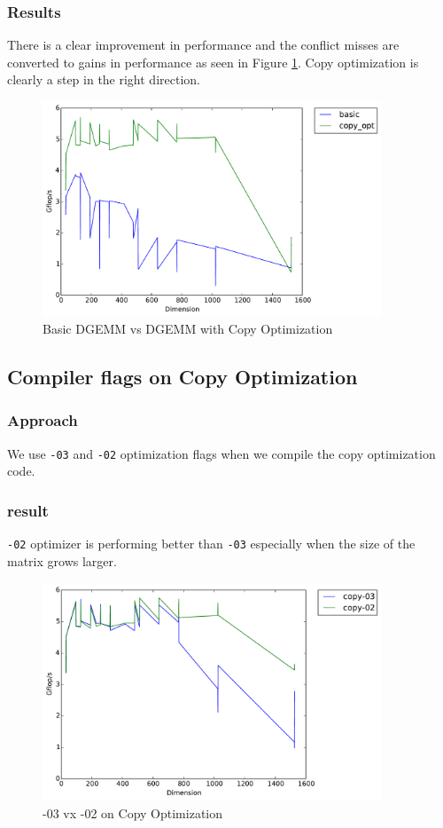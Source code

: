 \documentclass[11pt]{article}
\begin{document}
\subsubsection{Results}
There is a clear improvement in performance and the conflict misses are converted to gains in performance as seen in Figure \ref{basic_copy_opt}. Copy optimization is clearly a step in the right direction.
\begin{figure}[H]
    \includegraphics[width=0.9\textwidth]{timing_basic_vs_copy_opt.pdf}
    \caption{Basic DGEMM vs DGEMM with Copy Optimization}
    \label{basic_copy_opt}
\end{figure} 
\subsection{Compiler flags on Copy Optimization}
\subsubsection{Approach}
We use \texttt{-03} and \texttt{-02} optimization flags when we compile the copy optimization code.
\subsubsection{result}
\texttt{-02} optimizer is performing better than \texttt{-03}  especially when the size of the matrix grows larger.
\begin{figure}[H]
    \includegraphics[width=0.9\textwidth]{timing_flag0203_copy.pdf}
    \caption{-03 vx -02 on Copy Optimization}
    \label{0203}
\end{figure}
 
\end{document}
